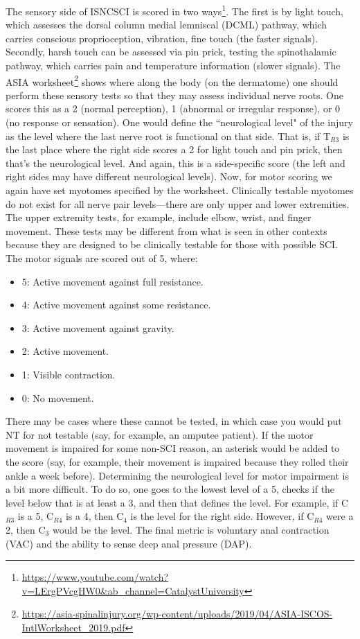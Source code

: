 The sensory side of ISNCSCI is scored in two ways\footnote{\url{https://www.youtube.com/watch?v=LErgPVcgHW0&ab_channel=CatalystUniversity}}. The first is by light touch, which assesses the dorsal column medial lemniscal (DCML) pathway, which carries conscious proprioception, vibration, fine touch (the faster signals). Secondly, harsh touch can be assessed via pin prick, testing the spinothalamic pathway, which carries pain and temperature information (slower signals). The ASIA worksheet\footnote{\url{https://asia-spinalinjury.org/wp-content/uploads/2019/04/ASIA-ISCOS-IntlWorksheet_2019.pdf}} shows where along the body (on the dermatome) one should perform these sensory tests so that they may assess individual nerve roots. One scores this as a 2 (normal perception), 1 (abnormal or irregular response), or 0 (no response or sensation). One would define the ``neurological level" of the injury as the level where the last nerve root is functional on that side. That is, if T$_{R3}$ is the last place where the right side scores a 2 for light touch and pin prick, then that's the neurological level. And again, this is a side-specific score (the left and right sides may have different neurological levels). Now, for motor scoring we again have set myotomes specified by the worksheet. Clinically testable myotomes do not exist for all nerve pair levels---there are only upper and lower extremities. The upper extremity tests, for example, include elbow, wrist, and finger movement. These tests may be different from what is seen in other contexts because they are designed to be clinically testable for those with possible SCI. The motor signals are scored out of 5, where:

\begin{itemize}
    \itemsep = 0em
    \item 5: Active movement against full resistance. 
    \item 4: Active movement against some resistance. 
    \item 3: Active movement against gravity. 
    \item 2: Active movement. 
    \item 1: Visible contraction. 
    \item 0: No movement. 
\end{itemize}

There may be cases where these cannot be tested, in which case you would put NT for not testable (say, for example, an amputee patient). If the motor movement is impaired for some non-SCI reason, an asterisk would be added to the score (say, for example, their movement is impaired because they rolled their ankle a week before). Determining the neurological level for motor impairment is a bit more difficult. To do so, one goes to the lowest level of a 5, checks if the level below that is at least a 3, and then that defines the level. For example, if C$_{R3}$ is a 5, C$_{R4}$ is a 4, then C$_4$ is the level for the right side. However, if C$_{R4}$ were a 2, then C$_3$ would be the level. The final metric is voluntary anal contraction (VAC) and the ability to sense deep anal pressure (DAP). \newline

